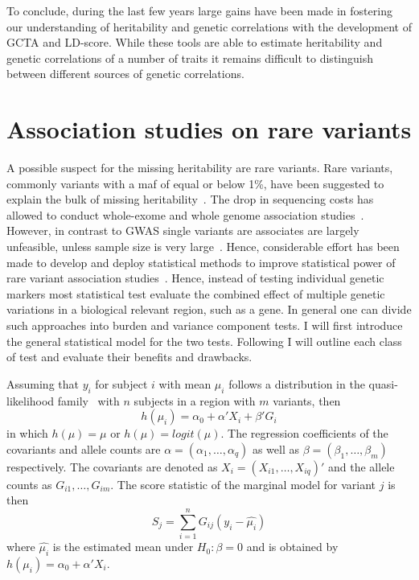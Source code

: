 \documentclass[../header.tex]{subfiles}
\begin{document}
To conclude, during the last few years large gains have been made in fostering our understanding of heritability and genetic correlations with the development of GCTA and LD-score.
While these tools are able to estimate heritability and genetic correlations of a number of traits it remains difficult to distinguish between different sources of genetic correlations.

\section{Association studies on rare variants}
\label{sec:association_studies_on_rare_varitants}

A possible suspect for the missing heritability are rare variants.
Rare variants, commonly variants with a \acrfull{maf} of equal or below 1\%, have been suggested to explain the bulk of missing heritability~\cite{Jiang2013,Li2009a}.
The drop in sequencing costs has allowed to conduct whole-exome and whole genome association studies~\cite{Goodwin2016}.
However, in contrast to GWAS single variants are associates are largely unfeasible, unless sample size is very large~\cite{Lee2014}.
Hence, considerable effort has been made to develop and deploy statistical methods to improve statistical power of rare variant association studies~\cite{Morris2010,Zeng2014,Daye2012,Manuscript2013}.
Hence, instead of testing individual genetic markers most statistical test evaluate the combined effect of multiple genetic variations in a biological relevant region, such as a gene.
In general one can divide such approaches into burden and variance component tests.
I will first introduce the general statistical model for the two tests.
Following I will outline each class of test and evaluate their benefits and drawbacks.

Assuming that $y_i$ for subject $i$ with mean $\mu_i$ follows a distribution in the quasi-likelihood family~\cite{Lee2014} with $n$ subjects in a region with $m$ variants, then
\begin{equation}
  h(\mu_i) = \alpha_0 + \alpha'X_i +\beta'G_i
\end{equation}
in which $h(\mu) = \mu$ or $h(\mu) = logit(\mu)$.
The regression coefficients of the covariants and allele counts are $\alpha = (\alpha_1, \ldots, \alpha_q)$ as well as $\beta = (\beta_1, \ldots, \beta_m)$ respectively.
The covariants are denoted as $X_i = (X_{i1}, \ldots, X_{iq})'$ and the allele counts as $G_{i1}, \ldots, G_{im}$.
The score statistic of the marginal model for variant $j$ is then
\begin{equation}
  S_j = \sum^n_{i=1} G_{ij}(y_i-\hat{\mu_i})
\end{equation}
where $\hat{\mu_i}$ is the estimated mean under $H_0: \beta = 0 $ and is obtained by $h(\mu_i) = \alpha_0 + \alpha'X_i$.
\end{document}
